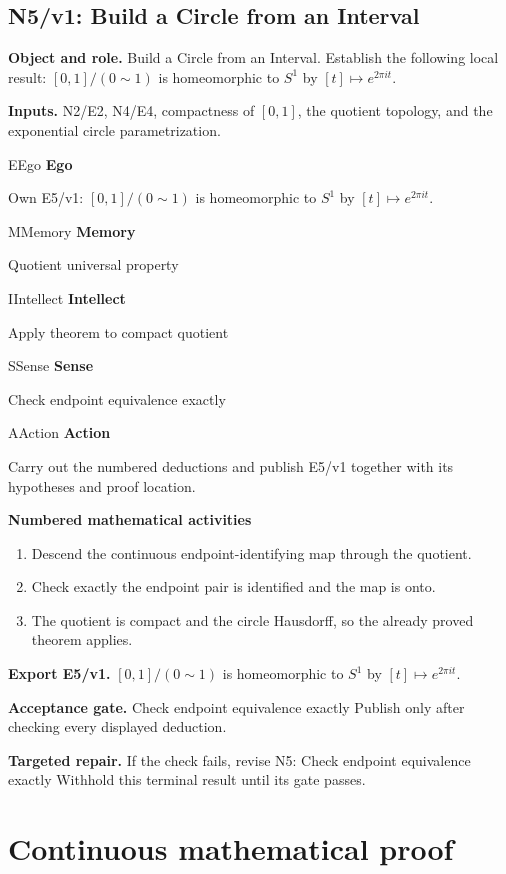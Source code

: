 \documentclass[preprint,12pt,aps,pra,showkeys,amsmath,amssymb,superscriptaddress,floatfix]{revtex4-2}
\theoremstyle{definition}
\theoremstyle{remark}
\newcommand{\mmfaculty}[3]{%
 \begin{mmfacultybox}{#1}{#2}
 {\sffamily\bfseries\color{MMBlue}#2}\par\smallskip #3
 \end{mmfacultybox}}
\newcommand{\field}[2]{\par\smallskip\noindent\textbf{#1.} #2\par}
\begin{document}
\clearpage

\subsection{N5/v1: Build a Circle from an Interval}

\field{Object and role}{Build a Circle from an Interval. Establish the following local result:
\([0,1]/(0\sim1)\) is homeomorphic to \(S^1\) by
\([t]\mapsto e^{2\pi it}\).}

\field{Inputs}{N2/E2, N4/E4, compactness of \([0,1]\), the quotient topology, and the
exponential circle parametrization.}

\mmfaculty{E}{Ego}{Own E5/v1: \([0,1]/(0\sim1)\) is homeomorphic to \(S^1\) by
\([t]\mapsto e^{2\pi it}\).}

\mmfaculty{M}{Memory}{Quotient universal property}

\mmfaculty{I}{Intellect}{Apply theorem to compact quotient}

\mmfaculty{S}{Sense}{Check endpoint equivalence exactly}

\mmfaculty{A}{Action}{Carry out the numbered deductions and publish E5/v1 together with its
hypotheses and proof location.}

\smallskip\noindent\textbf{Numbered mathematical activities}

\begin{enumerate}[label=N5.\arabic*,leftmargin=3.4em]

\item Descend the continuous endpoint-identifying map through the quotient.

\item Check exactly the endpoint pair is identified and the map is onto.

\item The quotient is compact and the circle Hausdorff, so the already proved
theorem applies.

\end{enumerate}

\field{Export E5/v1}{\([0,1]/(0\sim1)\) is homeomorphic to \(S^1\) by
\([t]\mapsto e^{2\pi it}\).}

\field{Acceptance gate}{Check endpoint equivalence exactly Publish only after checking every
displayed deduction.}

\field{Targeted repair}{If the check fails, revise N5: Check endpoint equivalence exactly
Withhold this terminal result until its gate passes.}

\endgroup\clearpage\section{Continuous mathematical proof}\label{sec:proof}
\end{document}

